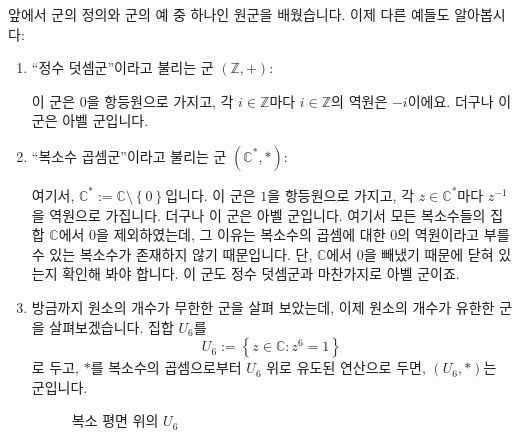 \documentclass[12pt]{paper}
\begin{document}
  앞에서 군의 정의와 군의 예 중 하나인 원군을 배웠습니다.
  이제 다른 예들도 알아봅시다:
  \begin{enumerate}
    
    \item ``정수 덧셈군''이라고 불리는 군 $\left( \mathbb{Z} , + \right)$:

    이 군은 $0$을 항등원으로 가지고,
    각 $i \in \mathbb{Z}$마다 $i \in \mathbb{Z}$의 역원은 $- i$이에요.
    더구나 이 군은 아벨 군입니다.

    \item ``복소수 곱셈군''이라고 불리는 군 $\left( \mathbb{C}^{*} , * \right)$:

    여기서, $\mathbb{C}^{*} := \mathbb{C} \setminus \left\{ 0 \right\}$입니다.
    이 군은 $1$을 항등원으로 가지고,
    각 $z \in \mathbb{C}^{*}$마다 $z^{-1}$을 역원으로 가집니다.
    더구나 이 군은 아벨 군입니다.
    여기서 모든 복소수들의 집합 $\mathbb{C}$에서 $0$을 제외하였는데,
    그 이유는 복소수의 곱셈에 대한 $0$의 역원이라고 부를 수 있는 복소수가 존재하지 않기 때문입니다.
    단, $\mathbb{C}$에서 $0$을 빼냈기 때문에 닫혀 있는지 확인해 봐야 합니다.
    이 군도 정수 덧셈군과 마찬가지로 아벨 군이죠.

    \item 방금까지 원소의 개수가 무한한 군을 살펴 보았는데, 이제 원소의 개수가 유한한 군을 살펴보겠습니다.
    집합 $U_6$를
    \begin{equation*}
      U_6 := \left\{ z \in \mathbb{C} : z^6 = 1 \right\}
    \end{equation*}
    로 두고,
    $*$를 복소수의 곱셈으로부터 $U_6$ 위로 유도된 연산으로 두면,
    $\left( U_6 , * \right)$는 군입니다.
    \begin{figure}[ht]
      \centering
      \caption{복소 평면 위의 $U_6$}
    \end{figure}


\end{enumerate}
\end{document}
